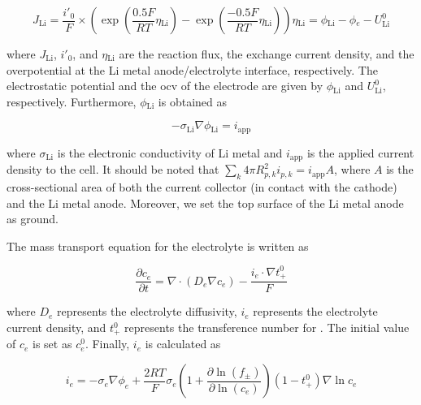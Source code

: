 \documentclass{article}
\begin{document}
\begin{subequations}
\begin{equation}
  J_{\mathrm{Li}}=\frac{i'_0}{F}\times \left(\exp\left(\frac{0.5F}{RT}\eta{}_{\mathrm{Li}}\right)-\exp\left(\frac{-0.5F}{RT}\eta{}_{\mathrm{Li}}\right)\right)
  \label{eq:4a}
\end{equation}
\begin{equation}
  \eta{}_{\mathrm{Li}}=\phi{}_{\mathrm{Li}}-\phi{}_e-U_{\mathrm{Li}}^0
  \label{eq:4b}
\end{equation}
\end{subequations}

where $J_{\mathrm{Li}}$, $i'_0$, and $\eta{}_{\mathrm{Li}}$ are the
reaction flux, the exchange current density, and the overpotential at
the Li metal anode/electrolyte interface, respectively. The
electrostatic potential and the \gls{ocv} of the electrode are given
by $\phi{}_{\mathrm{Li}}$ and $U_{\mathrm{Li}}^0$,
respectively. Furthermore, $\phi{}_{\mathrm{Li}}$ is obtained
as\cite{newman1993,newman1994}

\begin{equation}
  -\sigma{}_{\mathrm{Li}}\nabla{}\phi{}_{\mathrm{Li}}=i_{\mathrm{app}}
  \label{eq:5}
\end{equation}

where $\sigma{}_{\mathrm{Li}}$ is the electronic conductivity of Li metal and
$i_{\mathrm{app}}$ is the applied current density to the cell. It
should be noted that
$\sum_k4\pi R_{p,k}^2i_{p,k}=i_{\mathrm{app}}A$, where $A$ is the
cross-sectional area of both the current collector (in contact with
the \nca{} cathode) and the Li metal anode. Moreover, we set the top
surface of the Li metal anode as ground.

The mass transport equation for the electrolyte is written as\cite{newman1993,newman1994}

\begin{equation}
  \frac{\partial c_e}{\partial t} = \nabla \cdot \left(D_e \nabla c_e \right) - \frac{i_e\cdot\nabla{}t_{+}^0}{F}
  \label{eq:6}
\end{equation}

where $D_e$ represents the electrolyte diffusivity, $i_e$ represents
the electrolyte current density, and $t_+^0$ represents the
transference number for . The initial value of $c_e$ is set
as $c_e^0$. Finally, $i_e$ is calculated as\cite{newman1993,newman1994}

\begin{equation}
  i_e=-\sigma_e\nabla \phi _e+\frac{2RT}{F}\sigma_e\left(1+\frac{\partial \ln \left(f_{\pm}\right)}{\partial \ln \left(c_e\right)}\right)\left(1-t_+^0\right)\nabla \ln c_e
  \label{eq:7}
\end{equation}
\end{document}
